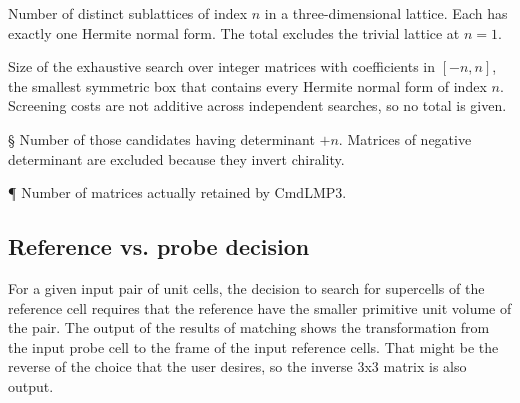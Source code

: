 \documentclass[preprint]{iucr}              %
\numberwithin{equation}{section}
\begin{document}
\begin{table}
	\vspace{2mm}
	
	\noindent
	{\dag} Number of distinct sublattices of index $n$ in a three-dimensional
	lattice. Each has exactly one Hermite normal form. The total excludes the
	trivial lattice at $n=1$.
	
	\noindent
	{\ddag} Size of the exhaustive search over integer matrices with coefficients in
	$[-n,n]$, the smallest symmetric box that contains every Hermite normal form of
	index $n$. Screening costs are not additive across independent searches, so no
	total is given.
	
	\noindent
	{\S} Number of those candidates having determinant $+n$. Matrices of negative
	determinant are excluded because they invert chirality.
	
	\noindent
	{\P} Number of matrices actually retained by CmdLMP3.
	
\end{table}


%

\subsection{Reference vs. probe decision}

For a given input pair of unit cells, the decision to 
search for supercells of the reference cell requires
that the reference have the smaller primitive unit
volume of the pair. The output of the results of matching
shows the transformation from the input probe cell to
the frame of the input reference cells. That might be
the reverse of the choice that the user desires, so
 the inverse 3x3 matrix is also output.



	



	
\end{document}
